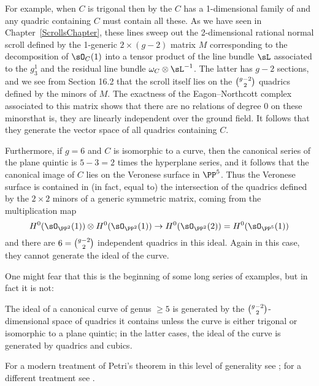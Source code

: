For example,
when $C$ is trigonal then by the 
%
$C$ has
%
a 1-dimensional family of 
%
and any quadric containing $C$
must contain all these. As we have seen in Chapter~\ref{ScrollsChapter},
these lines sweep
out the 2-dimensional rational normal scroll defined by the 1-generic
$2\times (g-2)$ matrix $M$ corresponding to the decomposition of
$\sO_C(1)$
into a tensor product of the  line bundle $\sL$ associated to the
$g^{1}_{3}$ and the residual line bundle $\omega_{C}\otimes \sL^{-1}$. The
latter has $g-2$ sections, and we see from Section 16.2
that the scroll itself lies on the $\tbinom{g-2}{2}$ quadrics defined
by the minors of $M$. The exactness of the Eagon--Northcott complex
associated to this matrix shows that there are no relations of degree
0 on these minors\emdash that is, they are linearly independent over
the ground field. It follows that they generate the vector space of all
quadrics containing $C$.

Furthermore, if $g = 6$ and $C$ is isomorphic to a 
%
curve,
then the canonical series of the plane quintic is $5-3 = 2$ times the
hyperplane series, and it follows that the canonical image of $C$ lies on
the Veronese surface in $\PP^{5}$. Thus the Veronese surface is contained
in (in fact, equal to) the intersection of the quadrics defined by the
$2\times 2$ minors of a generic symmetric matrix, coming from the
multiplication map
$$
H^{0}(\sO_{\PP^{2}}(1))\otimes H^{0}(\sO_{\PP^{2}}(1)) \to
H^{0}(\sO_{\PP^{2}}(2)) = H^{0}(\sO_{\PP^{5}}(1))
$$
and there are $6 = \tbinom{g-2}{ 2}$ independent quadrics in this
ideal. Again in this case, they cannot generate the ideal of the curve.

One might fear that this is the beginning of some long series of examples,
but in fact it is not:

\begin{theorem} [Petri]
The ideal of a canonical curve of genus $\geq 5$ is generated by the
%
$\tbinom{g-2}{ 2}$-dimensional space of quadrics it contains unless the curve
is either trigonal or isomorphic to a plane quintic; in the latter cases,
the ideal of the curve is generated by quadrics and cubics.
\unif
\end{theorem}

For a modern treatment of Petri's theorem in this level of generality see
\cite{Schreyer}; for a different treatment see \cite{Arbarello-Sernesi}.

